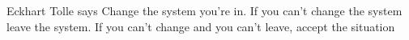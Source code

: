 Eckhart Tolle says
Change the system you're in. If you can't change the system leave the system. If you can't change and you can't leave, accept the situation